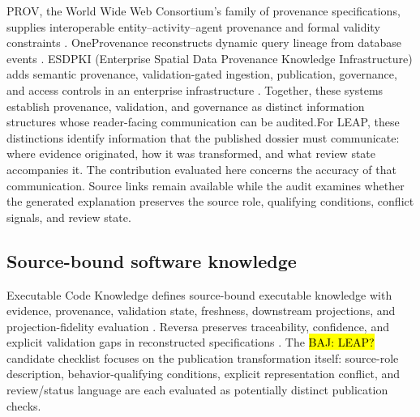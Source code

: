 \documentclass[a4paper,fleqn]{cas-dc}
\newcommand{\baj}[1]{{\sethlcolor{yellow}\hl{BAJ: #1}}}
\begin{document}
PROV, the World Wide Web Consortium's family of provenance specifications, supplies interoperable entity--activity--agent provenance and formal validity constraints \citep{Missier2013,W3CProvConstraints2013}. OneProvenance reconstructs dynamic query lineage from database events \citep{Psallidas2023}. ESDPKI (Enterprise Spatial Data Provenance Knowledge Infrastructure) adds semantic provenance, validation-gated ingestion, publication, governance, and access controls in an enterprise infrastructure \citep{Sadiq2026}. Together, these systems establish provenance, validation, and governance as distinct information structures whose reader-facing communication can be audited.For LEAP, these distinctions identify information that the published dossier must communicate: where evidence originated, how it was transformed, and what review state accompanies it. The contribution evaluated here concerns the accuracy of that communication. Source links remain available while the audit examines whether the generated explanation preserves the source role, qualifying conditions, conflict signals, and review state.

\subsection{Source-bound software knowledge}
Executable Code Knowledge defines source-bound executable knowledge with evidence, provenance, validation state, freshness, downstream projections, and projection-fidelity evaluation \citep{Gao2026}. Reversa preserves traceability, confidence, and explicit validation gaps in reconstructed specifications \citep{MacedoCosta2026}. The \baj{LEAP?} candidate checklist focuses on the publication transformation itself: source-role description, behavior-qualifying conditions, explicit representation conflict, and review/status language are each evaluated as potentially distinct publication checks.
\end{document}
